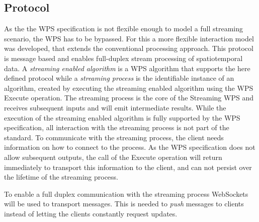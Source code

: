 \subsection{Protocol}
	As the the \ac{WPS} specification is not flexible enough to model a full streaming scenario, the \ac{WPS} has to be bypassed. For this a more flexible interaction model was developed, that extends the conventional processing approach. This protocol is message based and enables full-duplex stream processing of spatiotemporal data. A \emph{streaming enabled algorithm} is a \ac{WPS} algorithm that supports the here defined protocol while a \emph{streaming process} is the identifiable instance of an algorithm, created by executing the streaming enabled algorithm using the \ac{WPS} Execute operation. The streaming process is the core of the Streaming \ac{WPS} and receives subsequent inputs and will emit intermediate results. While the execution of the streaming enabled algorithm is fully supported by the \ac{WPS} specification, all interaction with the streaming process is not part of the standard. To communicate with the streaming process, the client needs information on how to connect to the process. As the \ac{WPS} specification does not allow subsequent outputs, the call of the Execute operation will return immediately to transport this information to the client, and can not persist over the lifetime of the streaming process.

	To enable a full duplex communication with the streaming process WebSockets will be used to transport messages. This is needed to \emph{push} messages to clients instead of letting the clients constantly request updates.

